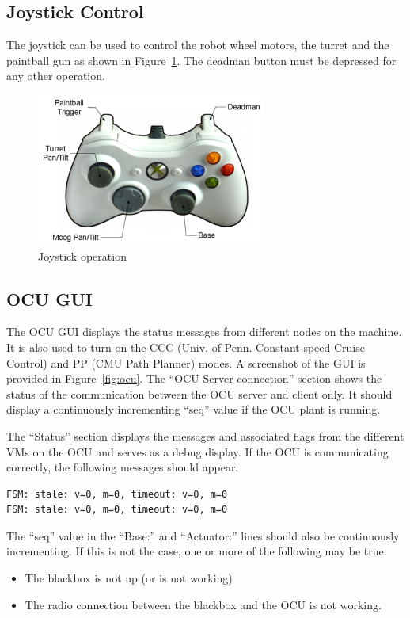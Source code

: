 \subsection{Joystick Control}
The joystick can be used to control the robot wheel motors, the turret and the paintball gun
as shown in Figure~\ref{fig:joystick}. The deadman button must be depressed for any other
operation.

\begin{figure}[htb]
\begin{center}
\includegraphics[height=50mm]{figures/joystick.png} 
\caption{Joystick operation}
\label{fig:joystick}
\end{center}
\end{figure}



\subsection{OCU GUI}

The OCU GUI displays the status messages from different nodes on the machine. It is also used to
turn on the CCC (Univ. of Penn. Constant-speed Cruise Control) and PP (CMU Path Planner) modes.
A screenshot of the GUI is provided in Figure~\ref{fig:ocu}. The ``OCU Server connection'' section
shows the status of the communication between the OCU server and client only. It should display
a continuously incrementing ``seq'' value if the OCU plant is running.

The ``Status'' section displays the messages and associated flags from the different VMs on the
OCU and serves as a debug display. If the OCU is communicating correctly, the following messages
should appear. 
\begin{lstlisting}
FSM: stale: v=0, m=0, timeout: v=0, m=0
FSM: stale: v=0, m=0, timeout: v=0, m=0
\end{lstlisting}
The ``seq'' value in the ``Base:'' and ``Actuator:'' lines should also be continuously incrementing. If
this is not the case, one or more of the following may be true.
\begin{itemize}
  \item The blackbox is not up (or is not working)
  \item The radio connection between the blackbox and the OCU is not working.
\end{itemize}

